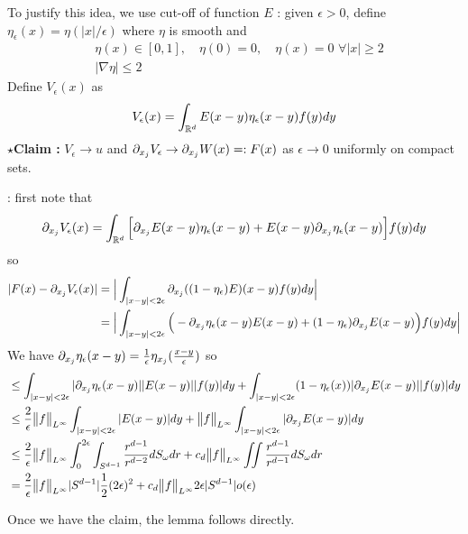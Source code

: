\documentclass[12pt,a4paper]{article}
\newenvironment{proof}
{\begin{changemargin}{1cm}{0.5cm} 
	}%
	{\end{changemargin}
}
\newenvironment{subproof}
{\begin{changemargin}{0.5cm}{0.5cm} 
	}%
	{\end{changemargin}
}
\newenvironment{p}
{\begin{proof} 
	}%
	{\end{proof}
}
\begin{document}
\begin{p}
\pf To justify this idea, we use cut-off of function $E$ : given $\epsilon>0$, define $\eta_{\epsilon}(x) = \eta( |x|/ \epsilon)$ where $\eta$ is smooth and
\begin{align*}
& \eta(x) \in [0,1], \quad \eta(0) =0, \quad \eta(x) =0 \,\, \forall |x| \geq 2 \\
& |\nabla \eta| \leq 2
\end{align*}
Define $V_{\epsilon}(x)$ as
\begin{align*}
V_{\epsilon}(x) = \int_{\mathbb{R}^d}  E(x-y) \eta_{\epsilon}(x-y) f(y)dy
\end{align*}
$\star$\textbf{Claim :} $V_{\epsilon} \rightarrow u$ and $\partial_{x_j} V_{\epsilon} \rightarrow \partial_{x_j} W(x) =: F(x)$ as $\epsilon \rightarrow 0$ uniformly on compact sets.
\begin{subproof}
: first note that
\begin{align*}
\partial_{x_j} V_{\epsilon}(x) = \int_{\mathbb{R}^d} \Big[ \partial_{x_j}E(x-y) \eta_{\epsilon}(x-y) + E(x-y) \partial_{x_j}\eta_{\epsilon}(x-y) \Big] f(y) dy
\end{align*}
so
\begin{align*}
|F(x)- \partial_{x_j}V_{\epsilon}(x) | &= \Big| \int_{|x-y| < 2\epsilon} \partial_{x_j}((1-\eta_{\epsilon})E)(x-y) f(y) dy \Big| \\
& = \Big| \int_{|x-y| < 2\epsilon} \Big( -\partial_{x_j} \eta_{\epsilon}(x-y)E(x-y) + (1-\eta_{\epsilon}) \partial_{x_j} E(x-y)\Big)f(y) dy \Big|
\end{align*}
We have $\partial_{x_j} \eta_{\epsilon}(x-y) = \frac{1}{\epsilon} \eta_{x_j}(\frac{x-y}{\epsilon})$ so
\begin{align*}
& \leq \int_{|x-y|< 2\epsilon} |\partial_{x_j} \eta_{\epsilon}(x-y)||E(x-y)||f(y)|dy + \int_{|x-y|<2\epsilon} (1-\eta_{\epsilon}(x)) |\partial_{x_j}E(x-y)| |f(y)|dy \\
& \leq \frac{2}{\epsilon} \bigl\lVert f\bigr\rVert_{L^{\infty}} \int_{|x-y|< 2\epsilon} |E(x-y)| dy + \bigl\lVert f\bigr\rVert_{L^{\infty}} \int_{|x-y|< 2\epsilon} |\partial_{x_j} E(x-y)|dy \\
& \leq \frac{2}{\epsilon}\bigl\lVert f\bigr\rVert_{L^{\infty}} \int_0^{2\epsilon} \int_{S^{d-1}} \frac{r^{d-1}}{r^{d-2}} dS_{\omega} dr + c_d \bigl\lVert f\bigr\rVert_{L^{\infty}} \iint \frac{r^{d-1}}{r^{d-1}}dS_{\omega} dr \\
& = \frac{2}{\epsilon} \bigl\lVert f\bigr\rVert_{L^{\infty}} |S^{d-1}| \frac{1}{2}(2\epsilon)^2 + c_d \bigl\lVert f\bigr\rVert_{L^{\infty}} 2\epsilon |S^{d-1}|  o(\epsilon)
\end{align*}
\end{subproof}
Once we have the claim, the lemma follows directly.

\eop
\end{p}
\s
\end{document}
